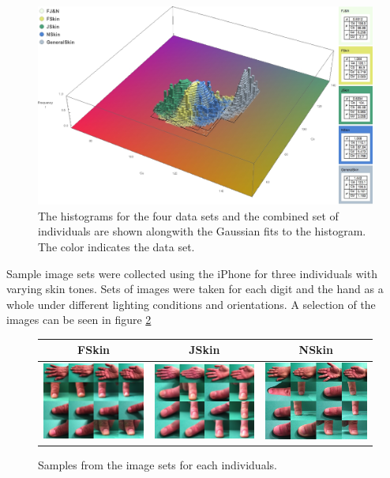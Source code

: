 \begin{figure}[h!]
  \centering
    \includegraphics[width=\textwidth]{Chapter3/Figs/All_Together_3D.jpg}
    \caption{The histograms for the four data sets and the combined set of individuals are shown alongwith the Gaussian fits to the histogram. The color indicates the data set.}  \label{fig:AllTogether3D}
\end{figure}

Sample image sets were collected using the iPhone for three individuals with varying skin tones. Sets of images were taken for each digit and the hand as a whole under different lighting conditions and orientations. A selection of the images can be seen in figure \ref{fig:SetSamples}


\begin{figure}[h!]
  \centering
  \begin{tabular}{||c||c||c||}
  \hline \rule[-2ex]{0pt}{5.5ex}  FSkin &  JSkin & NSkin \\ 
  \hline \rule[-2ex]{0pt}{5.5ex} 
  \includegraphics[width=0.3 \textwidth]{Chapter3/Figs/SampleCollages/FSkin_Sample.jpg} & 
  \includegraphics[width=0.3 \textwidth]{Chapter3/Figs/SampleCollages/JSkin_Sample.jpg} &  
  \includegraphics[width=0.3 \textwidth]{Chapter3/Figs/SampleCollages/NSkin_Sample.jpg}\\ 
  \hline 
  \end{tabular} 
    \caption{Samples from the image sets for each individuals.}  \label{fig:SetSamples}
\end{figure}

